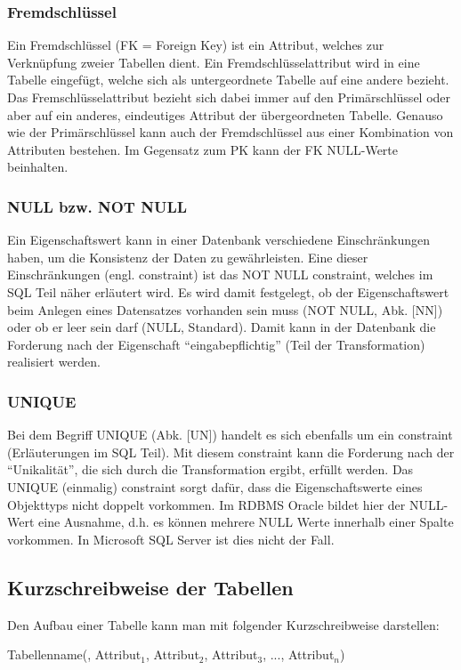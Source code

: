\subsubsection{Fremdschlüssel}
Ein Fremdschlüssel (FK = Foreign Key) ist ein Attribut, welches zur Verknüpfung zweier Tabellen dient. Ein Fremdschlüsselattribut wird in eine Tabelle eingefügt, welche sich als untergeordnete Tabelle auf eine andere bezieht. Das Fremschlüsselattribut bezieht sich dabei immer auf den Primärschlüssel oder aber auf ein anderes, eindeutiges Attribut der übergeordneten Tabelle. Genauso wie der Primärschlüssel kann auch der Fremdschlüssel aus einer Kombination von Attributen bestehen. Im Gegensatz zum PK kann der FK NULL-Werte beinhalten.
\subsubsection{NULL bzw. NOT NULL}
Ein Eigenschaftswert kann in einer Datenbank verschiedene Einschränkungen haben, um die Konsistenz der Daten zu gewährleisten. Eine dieser Einschränkungen (engl. constraint) ist das NOT NULL constraint, welches im SQL Teil näher erläutert wird. Es wird damit festgelegt, ob der Eigenschaftswert beim Anlegen eines Datensatzes vorhanden sein muss (NOT NULL, Abk. [NN]) oder ob er leer sein darf (NULL, Standard). Damit kann in der Datenbank die Forderung nach der Eigenschaft \enquote{eingabepflichtig} (Teil der Transformation) realisiert werden.
\subsubsection{UNIQUE}
Bei dem Begriff UNIQUE (Abk. [UN]) handelt es sich ebenfalls um ein constraint (Er\-läu\-terung\-en im SQL Teil). Mit diesem constraint kann die Forderung nach der \enquote{Unikalität}, die sich durch die Transformation ergibt, erfüllt werden. Das UNIQUE (einmalig) constraint sorgt dafür, dass die Eigenschaftswerte eines Objekttyps nicht doppelt vorkommen. Im RDBMS Oracle bildet hier der NULL-Wert eine Ausnahme, d.h. es können mehrere NULL Werte innerhalb einer Spalte vorkommen. In Microsoft SQL Server ist dies nicht der Fall.
\subsection{Kurzschreibweise der Tabellen}
Den Aufbau einer Tabelle kann man mit folgender Kurzschreibweise darstellen:

\centerline{Tabellenname(, Attribut$_1$, Attribut$_2$, Attribut$_3$, ..., Attribut$_n$)}

